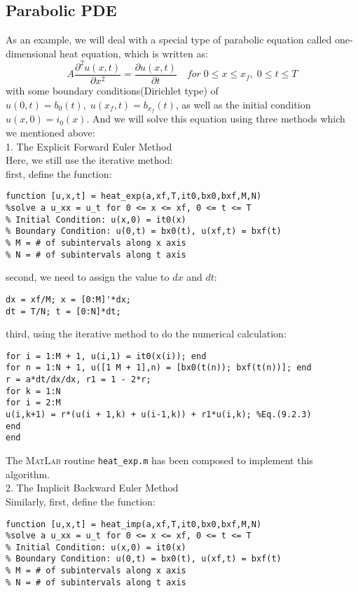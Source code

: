 \documentclass[a4paper]{article}
\begin{document}
\subsection{Parabolic PDE}
As an example, we will deal with a special type of parabolic equation called one-dimensional heat equation, which is written as:
\begin{equation}
A\frac{{{\partial ^2}u(x,t)}}{{\partial {x^2}}} = \frac{{\partial u(x,t)}}{{\partial t}}\quad for\;0 \le x \le {x_f},\;0 \le t \le T
\end{equation}
with some boundary conditions(Dirichlet type) of $u(0,t) = {b_0}(t),\;u({x_f},t) = {b_{{x_f}}}(t)$, as well as the initial condition $u(x,0) = {i_0}(x)$.
And we will solve this equation using three methods which we mentioned above:\\
1. The Explicit Forward Euler Method\\
Here, we still use the iterative method:\\
first, define the function:
\begin{verbatim}
function [u,x,t] = heat_exp(a,xf,T,it0,bx0,bxf,M,N)
%solve a u_xx = u_t for 0 <= x <= xf, 0 <= t <= T
% Initial Condition: u(x,0) = it0(x)
% Boundary Condition: u(0,t) = bx0(t), u(xf,t) = bxf(t)
% M = # of subintervals along x axis
% N = # of subintervals along t axis
\end{verbatim}
second, we need to assign the value to $dx$ and $dt$:
\begin{verbatim}
dx = xf/M; x = [0:M]'*dx;
dt = T/N; t = [0:N]*dt;
\end{verbatim}
third, using the iterative method to do the numerical calculation:
\begin{verbatim}
for i = 1:M + 1, u(i,1) = it0(x(i)); end
for n = 1:N + 1, u([1 M + 1],n) = [bx0(t(n)); bxf(t(n))]; end
r = a*dt/dx/dx, r1 = 1 - 2*r;
for k = 1:N
for i = 2:M
u(i,k+1) = r*(u(i + 1,k) + u(i-1,k)) + r1*u(i,k); %Eq.(9.2.3)
end
end
\end{verbatim}
The \textsc{MatLab} routine \verb$heat_exp.m$ has been composed to implement this algorithm.\\
2. The Implicit Backward Euler Method\\
Similarly, first, define the function:
\begin{verbatim}
function [u,x,t] = heat_imp(a,xf,T,it0,bx0,bxf,M,N)
%solve a u_xx = u_t for 0 <= x <= xf, 0 <= t <= T
% Initial Condition: u(x,0) = it0(x)
% Boundary Condition: u(0,t) = bx0(t), u(xf,t) = bxf(t)
% M = # of subintervals along x axis
% N = # of subintervals along t axis
\end{verbatim}
\end{document}
